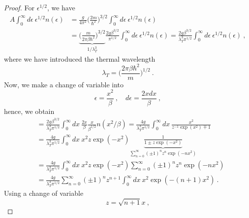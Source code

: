     \begin{proof}
        For $\epsilon^{1/2}$, we have 
        \begin{equation*}
        \begin{aligned}
            A \int_0^\infty d\epsilon ~ \epsilon^{1/2} n(\epsilon) & = \frac{g}{4 \pi^2} \Big(\frac{2m}{\hbar^2} \Big)^{3/2} \int_0^\infty d\epsilon ~ \epsilon^{1/2} n(\epsilon) \\ & = \underbrace{\Big ( \frac{m}{2 \pi \beta \hbar^2} \Big)^{3/2}}_{1 / \lambda_T^3} \frac{2 g \beta^{3/2}}{\pi^{1/2}} \int_0^\infty d\epsilon ~ \epsilon^{1/2} n(\epsilon)  = \frac{2 g \beta^{3/2}}{\lambda_T^3 \pi^{1/2}} \int_0^\infty d\epsilon ~ \epsilon^{1/2} n(\epsilon) ~,
        \end{aligned}
        \end{equation*}
        where we have introduced the thermal wavelength
        \begin{equation*}
            \lambda_T = \Big (\frac{2 \pi \beta \hbar^2}{m} \Big)^{1/2} ~.
        \end{equation*} 
        Now, we make a change of variable into
        \begin{equation*}
            \epsilon = \frac{x^2}{\beta} ~, \quad d \epsilon = \frac{2 x dx}{\beta} ~,
        \end{equation*}
        hence, we obtain 
        \begin{equation*}
        \begin{aligned}
            & = \frac{2 g \beta^{3/2}}{\lambda_T^3 \pi^{1/2}} \int_0^\infty dx ~ \frac{2 x}{\beta} \frac{x}{\beta^{1/2}} n(x^2 / \beta) = \frac{4 g}{\lambda_T^3 \pi^{1/2}} \int_0^\infty dx ~ \frac{x^2}{z^{-1} \exp(x^2) \mp 1} \\ & = \frac{4 g}{\lambda_T^3 \pi^{1/2}} \int_0^\infty dx ~ x^2 z \exp(-x^2) \underbrace{\frac{1}{1 \pm z \exp(-x^2)}}_{\sum_{n=0}^\infty (\pm 1)^n z^n \exp(-n x^2)} \\ & = \frac{4 g}{\lambda_T^3 \pi^{1/2}} \int_0^\infty dx ~ x^2 z \exp(-x^2) \sum_{n=0}^\infty (\pm 1)^n z^n \exp(-n x^2) \\ & = \frac{4 g}{\lambda_T^3 \pi^{1/2}} \sum_{n=0}^\infty (\pm 1)^n z^{n+1} \int_0^\infty dx ~ x^2 \exp(-(n + 1) x^2) ~.
        \end{aligned}
        \end{equation*}
        Using a change of variable 
        \begin{equation*}
            z = \sqrt{n+1} x ~,
        \end{equation*}

\end{proof}
